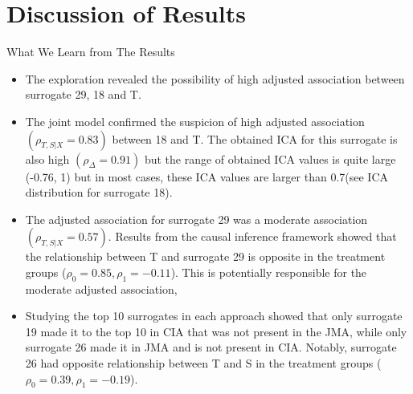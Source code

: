\documentclass[a4paper,9pt]{beamer}\usepackage[]{graphicx}\usepackage[]{color}
\begin{document}
\section{Discussion of Results}

\begin{frame}{What We Learn from The Results}
\begin{itemize}
\item The exploration revealed the possibility of high adjusted association between surrogate 29, 18 and T.
\item The joint model confirmed the suspicion of high adjusted association$(\rho_{T,S|X} = 0.83)$ between 18 and T. The obtained ICA for this surrogate is also high $(\rho_{\Delta} = 0.91)$ but the range of obtained ICA values is quite large (-0.76, 1) but in most cases, these ICA values are larger than 0.7(see ICA distribution for surrogate 18).

\item The adjusted association for surrogate 29 was a moderate association $(\rho_{T,S|X} = 0.57)$. Results from the causal inference framework showed that the relationship between T and surrogate 29 is opposite in the treatment groups ($\rho_0 = 0.85, \rho_1 = -0.11$). This is potentially responsible for the moderate adjusted association,

\item Studying the top 10 surrogates in each approach showed that only surrogate 19 made it to the top 10 in CIA that was not present in the JMA, while only surrogate 26 made it in JMA and is not present in CIA. Notably, surrogate 26 had opposite relationship between T and S in the treatment groups ($\rho_0 = 0.39, \rho_1 = -0.19$).

\end{itemize}
\end{frame}
\end{document}
